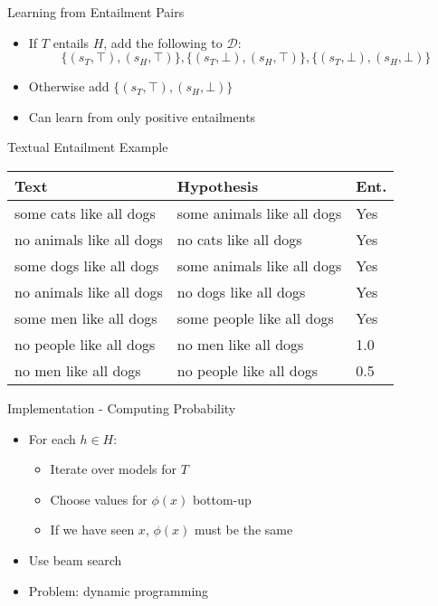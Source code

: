 \documentclass{beamer}
\newlength{\wideitemsep}
\let\olditem\item
\renewcommand{\item}{\setlength{\itemsep}{\wideitemsep}\olditem}
\begin{document}
\begin{frame}{Learning from Entailment Pairs}
  \begin{itemize}
    \item If $T$ entails $H$, add the following to $\mathcal{D}$:
      $$\{(s_T,\top),(s_H,\top)\}, \{(s_T,\bot),(s_H,\top)\},\{(s_T,\bot),(s_H,\bot)\}$$
    \item Otherwise add $\{(s_T,\top),(s_H,\bot)\}$
    \item Can learn from only positive entailments
  \end{itemize}
\end{frame}

\begin{frame}{Textual Entailment Example}
\begin{tabular}{|l|l|l|}
\hline
Text & Hypothesis & Ent.\\
\hline
some cats like all dogs & some animals like all dogs & Yes\\
no animals like all dogs & no cats like all dogs & Yes\\
some dogs like all dogs & some animals like all dogs & Yes\\
no animals like all dogs & no dogs like all dogs & Yes\\
some men like all dogs & some people like all dogs & Yes\\
\hline
no people like all dogs & no men like all dogs & 1.0\\
no men like all dogs & no people like all dogs & 0.5\\
\hline
\end{tabular}
\end{frame}

\begin{frame}{Implementation - Computing Probability}
  \begin{itemize}
  \item For each $h\in H$:
    \begin{itemize}
    \item Iterate over models for $T$
    \item Choose values for $\phi(x)$ bottom-up
    \item If we have seen $x$, $\phi(x)$ must be the same
    \end{itemize}
  \item Use beam search
  \item Problem: dynamic programming
  \end{itemize}
\end{frame}
\end{document}

